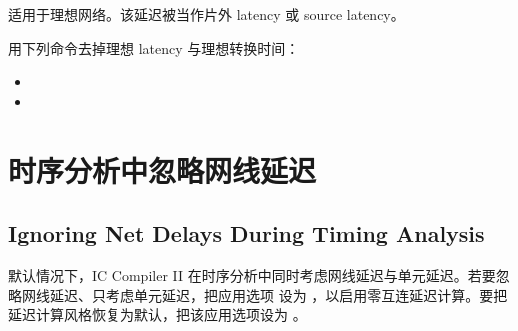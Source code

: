  适用于理想网络。该延迟被当作片外 latency 或 source latency。

用下列命令去掉理想 latency 与理想转换时间：
\begin{itemize}
  \item {}
  \item {}
\end{itemize}

\section{时序分析中忽略网线延迟}
\subsection*{Ignoring Net Delays During Timing Analysis}

默认情况下，IC Compiler II 在时序分析中同时考虑网线延迟与单元延迟。若要忽略网线延迟、只考虑单元延迟，把应用选项  设为 ，以启用零互连延迟计算。要把延迟计算风格恢复为默认，把该应用选项设为 。
